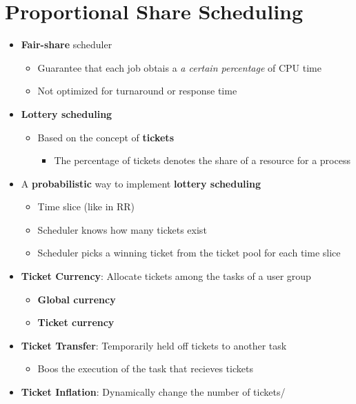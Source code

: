\documentclass[a4paper,11pt,english]{article}
\begin{document}
\section*{Proportional Share Scheduling}
\begin{itemize}
    \item \textbf{\color{blue} Fair-share} scheduler
        \begin{itemize}
            \item Guarantee that each job obtais a \textit{a certain percentage} of CPU time
            \item Not optimized for turnaround or response time 
        \end{itemize}
    \item \textbf{\color{blue} Lottery scheduling}
        \begin{itemize}
            \item Based on the concept of \textbf{\color{blue} tickets}
                \begin{itemize}
                    \item The percentage of tickets denotes the share of a resource for a process
                \end{itemize}
        \end{itemize}
    \item A \textbf{\color{blue} probabilistic} way to implement \textbf{\color{blue} lottery scheduling}
        \begin{itemize}
            \item Time slice (like in RR)
            \item Scheduler knows how many tickets exist
            \item Scheduler picks a winning ticket from the ticket pool for each time slice
        \end{itemize}
    \item \textbf{\color{blue} Ticket Currency}: Allocate tickets among the tasks of a user group
        \begin{itemize}
            \item \textbf{\color{blue} Global currency}
            \item \textbf{\color{blue} Ticket currency}
        \end{itemize}
    \item \textbf{\color{blue} Ticket Transfer}: Temporarily held off tickets to another task
        \begin{itemize}
            \item Boos the execution of the task that recieves tickets
        \end{itemize}
    \item \textbf{\color{blue} Ticket Inflation}: Dynamically change the number of tickets/
\end{itemize}
\end{document}
